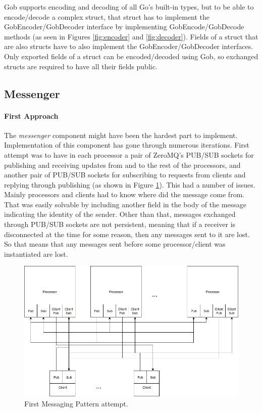 \documentclass[12pt,a4paper]{report}
\begin{document}
		   Gob supports encoding and decoding of all Go's built-in types, but to be able to encode/decode a complex struct, that struct has to implement the GobEncoder/GobDecoder interface by implementing GobEncode/GobDecode methods (as seen in Figures \ref{fig:encoder} and \ref{fig:decoder}). Fields of a struct that are also structs have to also implement the GobEncoder/GobDecoder interfaces. Only exported fields of a struct can be encoded/decoded using Gob, so exchanged structs are required to have all their fields public.
		    
		     		

		    \subsection{Messenger}
		        \paragraph{First Approach}
    		    The \textit{messenger} component might have been the hardest part to implement. Implementation of this component has gone through numerous iterations. First attempt was to have in each processor a pair of ZeroMQ's PUB/SUB sockets for publishing and receiving updates from and to the rest of the processors, and another pair of PUB/SUB sockets for subscribing to requests from clients and replying through publishing (as shown in Figure \ref{fig:pubsub}). This had a number of issues. Mainly processors and clients had to know where did the message come from. That was easily solvable by including another field in the body of the message indicating the identity of the sender. Other than that, messages exchanged through PUB/SUB sockets are not persistent, meaning that if a receiver is disconnected at the time for some reason, then any messages sent to it are lost. So that means that any messages sent before some processor/client was instantiated are lost.
    		     \begin{figure}
    		        \centering
    		        \includegraphics[scale = 0.4]{ade/messenger1.png}
    		        \caption{First Messaging Pattern attempt.}
    		        \label{fig:pubsub}
    		    \end{figure}
    		    		
\end{document}
